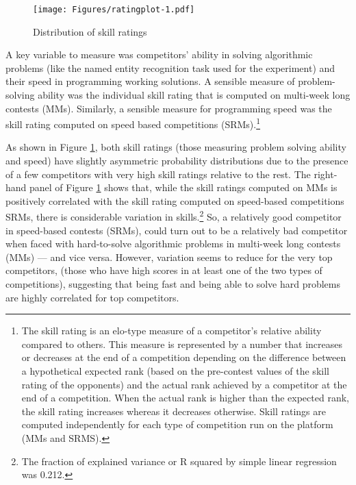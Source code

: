 \documentclass[10pt, titlepage]{article}
\begin{document}
\begin{figure}
\centering
\caption{Distribution of skill ratings}
\label{skill ratings}
\texttt{[image: Figures/ratingplot-1.pdf]}
\end{figure}

A key variable to measure was competitors' ability in solving
algorithmic problems (like the named entity recognition task used for
the experiment) and their speed in programming working solutions. A
sensible measure of problem-solving ability was the individual skill
rating that is computed on multi-week long contests (MMs). Similarly, a
sensible measure for programming speed was the skill rating computed on
speed based competitions (SRMs).\footnote{The skill rating is an
  elo-type measure of a competitor's relative ability compared to
  others. This measure is represented by a number that increases or
  decreases at the end of a competition depending on the difference
  between a hypothetical expected rank (based on the pre-contest values
  of the skill rating of the opponents) and the actual rank achieved by
  a competitor at the end of a competition. When the actual rank is
  higher than the expected rank, the skill rating increases whereas it
  decreases otherwise. Skill ratings are computed independently for each
  type of competition run on the platform (MMs and SRMS).}

As shown in Figure \ref{skill ratings}, both skill ratings (those
measuring problem solving ability and speed) have slightly asymmetric
probability distributions due to the presence of a few competitors with
very high skill ratings relative to the rest. The right-hand panel of
Figure \ref{skill ratings} shows that, while the skill ratings computed
on MMs is positively correlated with the skill rating computed on
speed-based competitions SRMs, there is considerable variation in
skills.\footnote{The fraction of explained variance or R squared by
  simple linear regression was 0.212.} So, a relatively good competitor
in speed-based contests (SRMs), could turn out to be a relatively bad
competitor when faced with hard-to-solve algorithmic problems in
multi-week long contests (MMs) --- and vice versa. However, variation
seems to reduce for the very top competitors, (those who have high
scores in at least one of the two types of competitions), suggesting
that being fast and being able to solve hard problems are highly
correlated for top competitors.
\end{document}
